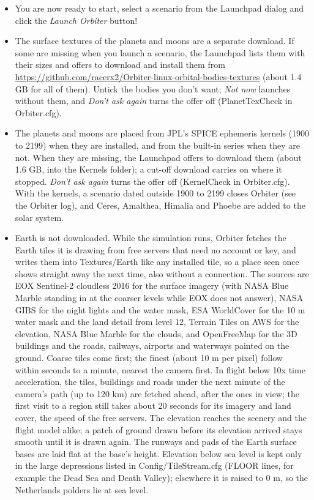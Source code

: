 \documentclass[Orbiter User Manual.tex]{subfiles}
\begin{document}
\begin{itemize}
\item You are now ready to start, select a scenario from the Launchpad dialog and click the \textit{Launch Orbiter} button!
\item The surface textures of the planets and moons are a separate download. If some are missing when you launch a scenario, the Launchpad lists them with their sizes and offers to download and install them from \url{https://github.com/racerx2/Orbiter-linux-orbital-bodies-textures} (about 1.4 GB for all of them). Untick the bodies you don't want; \textit{Not now} launches without them, and \textit{Don't ask again} turns the offer off (PlanetTexCheck in Orbiter.cfg).
\item The planets and moons are placed from JPL's SPICE ephemeris kernels (1900 to 2199) when they are installed, and from the built-in series when they are not. When they are missing, the Launchpad offers to download them (about 1.6 GB, into the Kernels folder); a cut-off download carries on where it stopped. \textit{Don't ask again} turns the offer off (KernelCheck in Orbiter.cfg). With the kernels, a scenario dated outside 1900 to 2199 closes Orbiter (see the Orbiter log), and Ceres, Amalthea, Himalia and Phoebe are added to the solar system.
\item Earth is not downloaded. While the simulation runs, Orbiter fetches the Earth tiles it is drawing from free servers that need no account or key, and writes them into Textures/Earth like any installed tile, so a place seen once shows straight away the next time, also without a connection. The sources are EOX Sentinel-2 cloudless 2016 for the surface imagery (with NASA Blue Marble standing in at the coarser levels while EOX does not answer), NASA GIBS for the night lights and the water mask, ESA WorldCover for the 10 m water mask and the land detail from level 12, Terrain Tiles on AWS for the elevation, NASA Blue Marble for the clouds, and OpenFreeMap for the 3D buildings and the roads, railways, airports and waterways painted on the ground. Coarse tiles come first; the finest (about 10 m per pixel) follow within seconds to a minute, nearest the camera first. In flight below 10x time acceleration, the tiles, buildings and roads under the next minute of the camera's path (up to 120 km) are fetched ahead, after the ones in view; the first visit to a region still takes about 20 seconds for its imagery and land cover, the speed of the free servers. The elevation reaches the scenery and the flight model alike; a patch of ground drawn before its elevation arrived stays smooth until it is drawn again. The runways and pads of the Earth surface bases are laid flat at the base's height. Elevation below sea level is kept only in the large depressions listed in Config/TileStream.cfg (FLOOR lines, for example the Dead Sea and Death Valley); elsewhere it is raised to 0 m, so the Netherlands polders lie at sea level.

\end{itemize}
\end{document}

